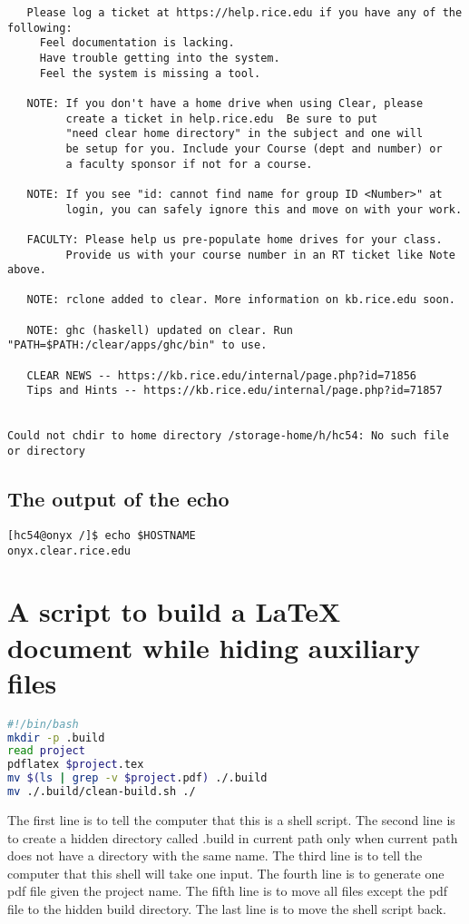 \documentclass[10pt,a4paper]{article}
\begin{document}
\begin{verbatim}
   Please log a ticket at https://help.rice.edu if you have any of the following:
     Feel documentation is lacking.
     Have trouble getting into the system.
     Feel the system is missing a tool.
 
   NOTE: If you don't have a home drive when using Clear, please 
         create a ticket in help.rice.edu  Be sure to put 
         "need clear home directory" in the subject and one will 
         be setup for you. Include your Course (dept and number) or 
         a faculty sponsor if not for a course.
 
   NOTE: If you see "id: cannot find name for group ID <Number>" at 
         login, you can safely ignore this and move on with your work.
 
   FACULTY: Please help us pre-populate home drives for your class.
         Provide us with your course number in an RT ticket like Note above.
 
   NOTE: rclone added to clear. More information on kb.rice.edu soon.
 
   NOTE: ghc (haskell) updated on clear. Run "PATH=$PATH:/clear/apps/ghc/bin" to use.
 
   CLEAR NEWS -- https://kb.rice.edu/internal/page.php?id=71856
   Tips and Hints -- https://kb.rice.edu/internal/page.php?id=71857
 

Could not chdir to home directory /storage-home/h/hc54: No such file or directory    
\end{verbatim}

\subsection{The output of the echo}
\begin{verbatim}
[hc54@onyx /]$ echo $HOSTNAME
onyx.clear.rice.edu    
\end{verbatim}

\section{A script to build a LaTeX document while hiding auxiliary files}

\begin{lstlisting}[language=bash,caption={Shell Script for hiding auxiliary files}]
#!/bin/bash
mkdir -p .build
read project
pdflatex $project.tex
mv $(ls | grep -v $project.pdf) ./.build
mv ./.build/clean-build.sh ./
\end{lstlisting}

The first line is to tell the computer that this is a shell script. The second line is to create a hidden directory called .build in current path only when current path does not have a directory with the same name. The third line is to tell the computer that this shell will take one input. The fourth line is to generate one pdf file given the project name. The fifth line is to move all files except the pdf file to the hidden build directory. The last line is to move the shell script back.
\end{document}
